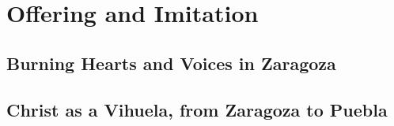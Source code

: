 \chapter{Offering and Imitation}

\section{Burning Hearts and Voices in Zaragoza}

\section{Christ as a Vihuela, from Zaragoza to Puebla}

